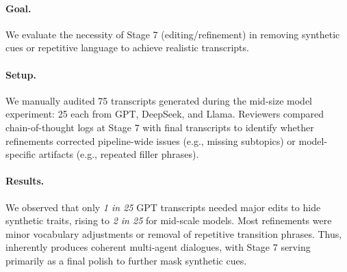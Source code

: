 \paragraph{Goal.}
We evaluate the necessity of Stage 7 (editing/refinement) in removing synthetic cues or repetitive language to achieve realistic transcripts.

\paragraph{Setup.}
We manually audited 75 transcripts generated during the mid-size model experiment: 25 each from GPT, DeepSeek, and Llama. Reviewers compared chain-of-thought logs at Stage 7 with final transcripts to identify whether refinements corrected pipeline-wide issues (e.g., missing subtopics) or model-specific artifacts (e.g., repeated filler phrases).

\paragraph{Results.}
We observed that only \emph{1 in 25} GPT transcripts needed major edits to hide synthetic traits, rising to \emph{2 in 25} for mid-scale models. Most refinements were minor vocabulary adjustments or removal of repetitive transition phrases. Thus, \pipeline{} inherently produces coherent multi-agent dialogues, with Stage 7 serving primarily as a final polish to further mask synthetic cues.


